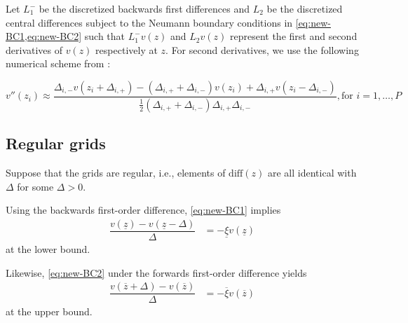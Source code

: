 \documentclass[11pt]{article}
\begin{document}
Let $L_1^{-}$ be the discretized backwards first differences and $L_2$ be the discretized central differences subject to the Neumann boundary conditions in \cref{eq:new-BC1,eq:new-BC2} such that $L_1^{-} v(z)$ and $L_2 v(z)$ represent the first and second derivatives of $v(z)$ respectively at $z$. For second derivatives, we use the following numerical scheme from \cite{achdou17}:

\begin{equation}
v''(z_i) \approx \dfrac{ \Delta_{i,-} v( z_i + \Delta_{i,+}) - (\Delta_{i,+} + \Delta_{i,-}) v( z_i ) + \Delta_{i,+} v( z_i - \Delta_{i,-})}{\frac{1}{2}(\Delta_{i,+} + \Delta_{i,-}) \Delta_{i,+} \Delta_{i,-} }, \text{for } i = 1, \ldots, P
\end{equation}





\subsection{Regular grids}
Suppose that the grids are regular, i.e., elements of $\text{diff}(z)$ are all identical with $\Delta$ for some $\Delta > 0$.

Using the backwards first-order difference, \eqref{eq:new-BC1} implies
\begin{align}
\dfrac{v(\underline{z}) - v(\underline{z}-\Delta)}{\Delta} &= - \underline{\xi} v(\underline{z})
\end{align}
at the lower bound.

Likewise, \eqref{eq:new-BC2} under the forwards first-order difference yields
\begin{align}
\dfrac{v(\overline{z} + \Delta) - v(\overline{z})}{\Delta} &= - \overline{\xi} v(\overline{z})
\end{align}
at the upper bound.
\end{document}
